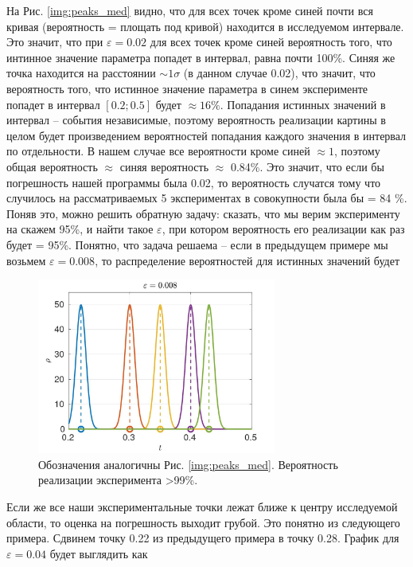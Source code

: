 \documentclass[a4paper,12pt]{article} %
\begin{document}
На Рис. \ref{img:peaks_med} видно, что для всех точек кроме синей почти вся кривая (вероятность = площать под кривой) находится в исследуемом интервале. Это значит, что при $\varepsilon = 0.02$ для всех точек кроме синей вероятность того, что интинное значение параметра попадет в интервал, равна почти 100\%. Синяя же точка находится на расстоянии $\sim 1 \sigma$ (в данном случае 0.02), что значит, что вероятность того, что истинное значение параметра в синем эксперименте попадет в интервал $[0.2; 0.5]$ будет $\approx 16 \%$. Попадания истинных значений в интервал -- события независимые, поэтому вероятность реализации картины в целом будет произведением вероятностей попадания каждого значения в интервал по отдельности. В нашем случае все вероятности кроме синей $\approx 1$, поэтому общая вероятность $\approx$ синяя вероятность $\approx$ 0.84\%. Это значит, что если бы погрешность нашей программы была 0.02, то вероятность случатся тому что случилось на рассматриваемых 5 экспериментах в совокупности была бы = 84 \%. Поняв это, можно решить обратную задачу: сказать, что мы верим эксперименту на скажем 95\%, и найти такое $\varepsilon$, при котором вероятность его реализации как раз будет = 95\%. Понятно, что задача решаема -- если в предыдущем примере мы возьмем $\varepsilon = 0.008$, то распределение вероятностей для истинных значений будет 

\begin{figure}[h!]
\begin{center}
\includegraphics[width=0.7\textwidth]{./pics/peaks_sharp_med}
\end{center}
\caption{Обозначения аналогичны Рис. \ref{img:peaks_med}. Вероятность реализации эксперимента >99\%.} \label{img:peaks_sharp_med}
\end{figure}

\newpage

Если же все наши экспериментальные точки лежат ближе к центру исследуемой области, то оценка на погрешность выходит грубой. Это понятно из следующего примера. Сдвинем точку 0.22 из предыдущего примера в точку 0.28. График для $\varepsilon = 0.04$ будет выглядить как
\end{document}
